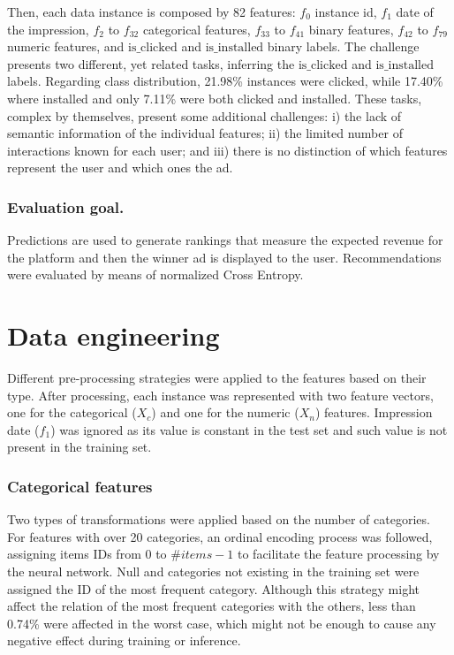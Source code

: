 \documentclass[manuscript,nonacm]{acmart}
\begin{document}
\smallskip
Then, each data instance is composed by 82 features: $f_{0}$ instance id, $f_{1}$ date of the impression, $f_{2}$ to $f_{32}$ categorical features, $f_{33}$ to $f_{41}$ binary features, $f_{42}$ to $f_{79}$ numeric features, and $\text{is\_clicked}$ and $\text{is\_installed}$ binary labels. The challenge presents two different, yet related tasks, inferring the $\text{is\_clicked}$ and $\text{is\_installed}$ labels. Regarding class distribution, 21.98\% instances were clicked, while 17.40\% where installed and only 7.11\% were both clicked and installed.
These tasks, complex by themselves, present some additional challenges: i) the lack of semantic information of the individual features; ii) the limited number of interactions known for each user; 
and iii) there is no distinction of which features represent the user and which ones the ad. 

\subsubsection*{\textbf{Evaluation goal.}}\hfill

Predictions are used to generate rankings that measure the expected revenue for the platform and then the winner ad is displayed to the user. Recommendations were evaluated by means of normalized Cross Entropy.

\section{Data engineering}\label{sec:data-eng}
Different pre-processing strategies were applied to the features based on their type. After processing, each instance was represented with two feature vectors, one for the categorical ($X_c$) and one for the numeric ($X_n$) features. Impression date ($f_{1}$) was ignored as its value is constant in the test set and such value is not present in the training set.

\subsubsection*{\textbf{Categorical features}}\hfill 

Two types of transformations were applied based on the number of categories. For features with over 20 categories, an ordinal encoding process was followed, assigning items IDs from 0 to $\#items -1$ to facilitate the feature processing by the neural network. Null and categories not existing in the training set were assigned 
the ID of the most frequent category. Although this strategy might affect the relation of the most frequent categories with the others, less than 0.74\% were affected in the worst case, which might not be enough to cause any negative effect during training or inference.
\end{document}
